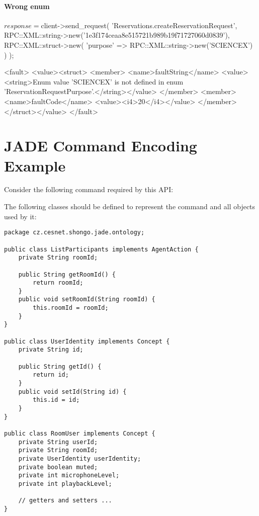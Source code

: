 \subsubsection{Wrong enum}
\begin{PerlCmd}
$response = $client->send_request(
    'Reservations.createReservationRequest',
    RPC::XML::string->new('1e3f174ceaa8e515721b989b19f71727060d0839'),
    RPC::XML::struct->new(
        'purpose' => RPC::XML::string->new('SCIENCEX')
    )
);
\end{PerlCmd}
\begin{PerlResponse}
<fault>
  <value><struct>
    <member>
      <name>faultString</name>
      <value><string>Enum value 'SCIENCEX' is not defined in enum
          'ReservationRequestPurpose'.</string></value>
    </member>
    <member>
      <name>faultCode</name>
      <value><i4>20</i4></value>
    </member>
  </struct></value>
</fault>
\end{PerlResponse}

\chapter{JADE Command Encoding Example} \label{appendix:jade-command-encoding}

Consider the following command required by this API:
\begin{Api}
\end{Api}
The following classes should be defined to represent the command and all objects used by it:
\begin{verbatim}
package cz.cesnet.shongo.jade.ontology;

public class ListParticipants implements AgentAction {
    private String roomId;

    public String getRoomId() {
        return roomId;
    }
    public void setRoomId(String roomId) {
        this.roomId = roomId;
    }
}

public class UserIdentity implements Concept {
    private String id;

    public String getId() {
        return id;
    }
    public void setId(String id) {
        this.id = id;
    }
}

public class RoomUser implements Concept {
    private String userId;
    private String roomId;
    private UserIdentity userIdentity;
    private boolean muted;
    private int microphoneLevel;
    private int playbackLevel;

    // getters and setters ...
}
\end{verbatim}

